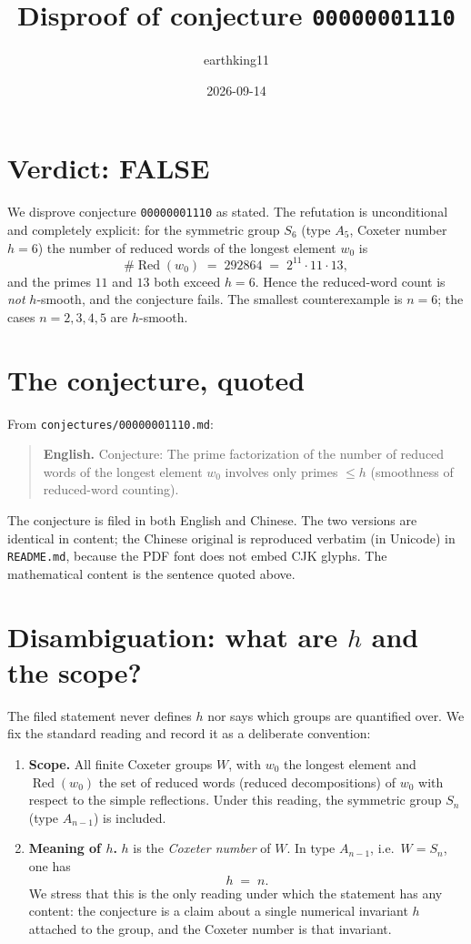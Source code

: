 \documentclass[11pt]{article}
\title{Disproof of conjecture \texttt{00000001110}}
\author{earthking11}
\date{2026-09-14}
\theoremstyle{definition}
\theoremstyle{remark}
\newcommand{\Red}{\operatorname{Red}}
\begin{document}
\maketitle

\section*{Verdict: FALSE}

We disprove conjecture \texttt{00000001110} as stated. The refutation is
unconditional and completely explicit: for the symmetric group $S_6$ (type
$A_5$, Coxeter number $h = 6$) the number of reduced words of the longest
element $w_0$ is
\[
\#\Red(w_0) \;=\; 292864 \;=\; 2^{11}\cdot 11\cdot 13 ,
\]
and the primes $11$ and $13$ both exceed $h = 6$. Hence the reduced-word
count is \emph{not} $h$-smooth, and the conjecture fails. The smallest
counterexample is $n = 6$; the cases $n = 2,3,4,5$ are $h$-smooth.

\section{The conjecture, quoted}

From \texttt{conjectures/00000001110.md}:

\begin{quote}
\textbf{English.} Conjecture: The prime factorization of the number of reduced
words of the longest element $w_0$ involves only primes $\le h$ (smoothness of
reduced-word counting).
\end{quote}

The conjecture is filed in both English and Chinese. The two versions are
identical in content; the Chinese original is reproduced verbatim (in Unicode)
in \texttt{README.md}, because the PDF font does not embed CJK glyphs. The
mathematical content is the sentence quoted above.

\section{Disambiguation: what are $h$ and the scope?}

The filed statement never defines $h$ nor says which groups are quantified
over. We fix the standard reading and record it as a deliberate convention:

\begin{enumerate}
\item \textbf{Scope.} All finite Coxeter groups $W$, with $w_0$ the longest
  element and $\Red(w_0)$ the set of reduced words (reduced decompositions)
  of $w_0$ with respect to the simple reflections. Under this reading, the
  symmetric group $S_n$ (type $A_{n-1}$) is included.
\item \textbf{Meaning of $h$.} $h$ is the \emph{Coxeter number} of $W$. In
  type $A_{n-1}$, i.e.\ $W = S_n$, one has
  \[
  h \;=\; n .
  \]
  We stress that this is the only reading under which the statement has any
  content: the conjecture is a claim about a single numerical invariant $h$
  attached to the group, and the Coxeter number is that invariant.
\end{enumerate}
\end{document}
